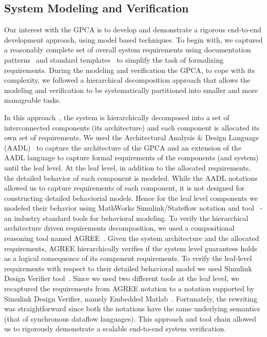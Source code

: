 \subsection {System Modeling and Verification}
\vspace{-0.1in}
Our interest with the GPCA is to develop and demonstrate a rigorous end-to-end development approach, using model based techniques. To begin with, we captured a reasonably complete set of overall system requirements using documentation patterns~\cite{mavin2009easy} and standard templates~\cite{IEEESRS} to simplify the task of formalizing requirements. During the modeling and verification the GPCA, to cope with its complexity, we followed a hierarchical decomposition approach that allows the modeling and verification to be systematically partitioned into smaller and more manageable tasks.

In this approach~\cite{hilt2013}, the system is hierarchically decomposed into a set of interconnected components (its architecture) and each component is allocated its own set of requirements. We used the Architectural Analysis \& Design Language (AADL)~\cite{AADL:Overview} to capture the architecture of the GPCA and an extension of the AADL language to capture formal requirements of the components (and system) until the leaf level. At the leaf level, in addition to the allocated requirements, the detailed behavior of each component is modeled. While the AADL notations allowed us to capture requirements of each component, it is not designed for constructing detailed behaviorial models. Hence for the leaf level components we modeled their behavior using MathWorks Simulink/Stateflow notation and tool~\cite{MathWorks} - an industry standard tools for behavioral modeling. To verify the hierarchical architecture driven requirements decomposition, we used a compositional reasoning tool named AGREE~\cite{NFM2012:CoGaMiWhLaLu}. Given the system architecture and the allocated requirements, AGREE hierarchically verifies if the system level guarantees holds as a logical consequence of its component requirements. To verify the leaf-level requirements with respect to their detailed behavioral model we used Simulink Design Verifier tool~\cite{MathWorks}. Since we used two different tools at the leaf level, we recaptured the requirements from AGREE notation to a notation supported by Simulink Design Verifier, namely Embedded Matlab~\cite{MathWorks}. Fortunately, the rewriting was straightforward since both the notations have the same underlying semantics (that of synchronous dataflow languages). This approach and tool chain allowed us to rigorously demonstrate a scalable end-to-end system verification.

